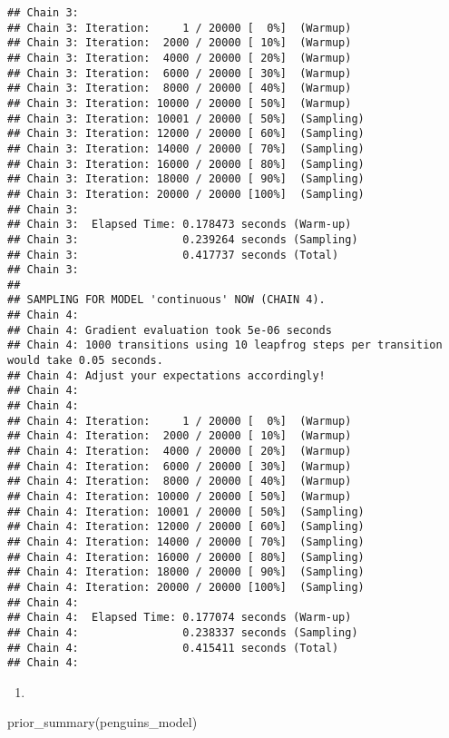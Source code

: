 \documentclass[
]{article}
\newenvironment{Shaded}{\begin{snugshade}}{\end{snugshade}}
\newcommand{\FunctionTok}[1]{\textcolor[rgb]{0.00,0.00,0.00}{#1}}
\newcommand{\NormalTok}[1]{#1}
\providecommand{\tightlist}{%
  \setlength{\itemsep}{0pt}\setlength{\parskip}{0pt}}
\begin{document}
\begin{verbatim}
## Chain 3: 
## Chain 3: Iteration:     1 / 20000 [  0%]  (Warmup)
## Chain 3: Iteration:  2000 / 20000 [ 10%]  (Warmup)
## Chain 3: Iteration:  4000 / 20000 [ 20%]  (Warmup)
## Chain 3: Iteration:  6000 / 20000 [ 30%]  (Warmup)
## Chain 3: Iteration:  8000 / 20000 [ 40%]  (Warmup)
## Chain 3: Iteration: 10000 / 20000 [ 50%]  (Warmup)
## Chain 3: Iteration: 10001 / 20000 [ 50%]  (Sampling)
## Chain 3: Iteration: 12000 / 20000 [ 60%]  (Sampling)
## Chain 3: Iteration: 14000 / 20000 [ 70%]  (Sampling)
## Chain 3: Iteration: 16000 / 20000 [ 80%]  (Sampling)
## Chain 3: Iteration: 18000 / 20000 [ 90%]  (Sampling)
## Chain 3: Iteration: 20000 / 20000 [100%]  (Sampling)
## Chain 3: 
## Chain 3:  Elapsed Time: 0.178473 seconds (Warm-up)
## Chain 3:                0.239264 seconds (Sampling)
## Chain 3:                0.417737 seconds (Total)
## Chain 3: 
## 
## SAMPLING FOR MODEL 'continuous' NOW (CHAIN 4).
## Chain 4: 
## Chain 4: Gradient evaluation took 5e-06 seconds
## Chain 4: 1000 transitions using 10 leapfrog steps per transition would take 0.05 seconds.
## Chain 4: Adjust your expectations accordingly!
## Chain 4: 
## Chain 4: 
## Chain 4: Iteration:     1 / 20000 [  0%]  (Warmup)
## Chain 4: Iteration:  2000 / 20000 [ 10%]  (Warmup)
## Chain 4: Iteration:  4000 / 20000 [ 20%]  (Warmup)
## Chain 4: Iteration:  6000 / 20000 [ 30%]  (Warmup)
## Chain 4: Iteration:  8000 / 20000 [ 40%]  (Warmup)
## Chain 4: Iteration: 10000 / 20000 [ 50%]  (Warmup)
## Chain 4: Iteration: 10001 / 20000 [ 50%]  (Sampling)
## Chain 4: Iteration: 12000 / 20000 [ 60%]  (Sampling)
## Chain 4: Iteration: 14000 / 20000 [ 70%]  (Sampling)
## Chain 4: Iteration: 16000 / 20000 [ 80%]  (Sampling)
## Chain 4: Iteration: 18000 / 20000 [ 90%]  (Sampling)
## Chain 4: Iteration: 20000 / 20000 [100%]  (Sampling)
## Chain 4: 
## Chain 4:  Elapsed Time: 0.177074 seconds (Warm-up)
## Chain 4:                0.238337 seconds (Sampling)
## Chain 4:                0.415411 seconds (Total)
## Chain 4:
\end{verbatim}

\begin{enumerate}
\def\labelenumi{\alph{enumi}.}
\setcounter{enumi}{1}
\tightlist
\item
\end{enumerate}

\begin{Shaded}
\begin{Highlighting}[]
\FunctionTok{prior\_summary}\NormalTok{(penguins\_model)}
\end{Highlighting}
\end{Shaded}
\end{document}
